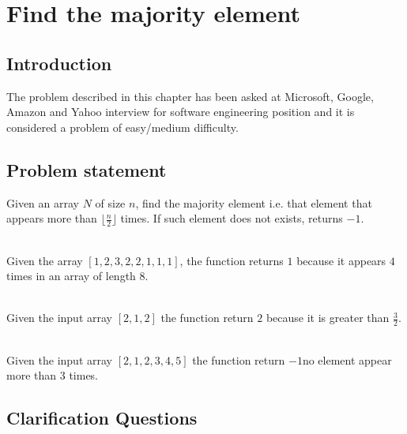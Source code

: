 %

\chapter{Find the majority element}
\label{ch:majority_element}
\section*{Introduction}
The problem described in this chapter has been asked at Microsoft, Google, Amazon and Yahoo interview for software engineering position and it is considered a problem of easy/medium difficulty.

\section{Problem statement}
\begin{exercise}
Given an array $N$ of size $n$, find the majority element i.e. that element that appears more than $\lfloor \frac{n}{2} \rfloor$ times.
If such element does not exists, returns $-1$.
	\begin{example}
		\hfill \\
		Given the array $[1,2,3,2,2,1,1,1]$, the function returns $1$ because it appears $4$ times in an array of length $8$.
	
	\end{example}

	\begin{example}
		\hfill \\
		Given the input array $[2, 1, 2]$ the function return $2$ because it is greater than $\frac{3}{2}$.
		
	\end{example}

	\begin{example}
		\hfill \\
		Given the input array $[2, 1, 2,3,4,5]$ the function return $-1$no element appear more than $3$ times.
		
	\end{example}

\end{exercise}

\section{Clarification Questions}

